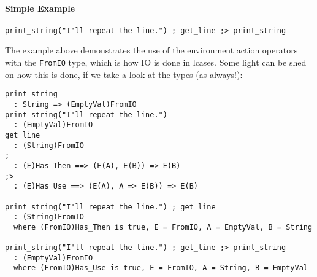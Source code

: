\documentclass{article}
\begin{document}
\paragraph{Simple Example}
\begin{verbatim}
print_string("I'll repeat the line.") ; get_line ;> print_string
\end{verbatim}
The example above demonstrates the use of the environment action operators with
the \texttt{FromIO} type, which is how IO is done in lcases. Some light can
be shed on how this is done, if we take a look at the types (as always!):
\begin{verbatim}
print_string
  : String => (EmptyVal)FromIO
print_string("I'll repeat the line.")
  : (EmptyVal)FromIO
get_line
  : (String)FromIO
; 
  : (E)Has_Then ==> (E(A), E(B)) => E(B) 
;>
  : (E)Has_Use ==> (E(A), A => E(B)) => E(B) 

print_string("I'll repeat the line.") ; get_line
  : (String)FromIO
  where (FromIO)Has_Then is true, E = FromIO, A = EmptyVal, B = String

print_string("I'll repeat the line.") ; get_line ;> print_string
  : (EmptyVal)FromIO
  where (FromIO)Has_Use is true, E = FromIO, A = String, B = EmptyVal
\end{verbatim}
\end{document}
